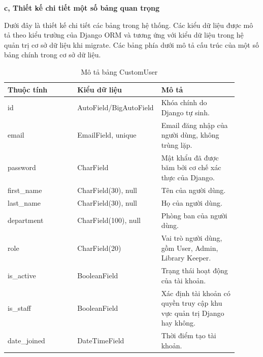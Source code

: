 ﻿\documentclass[../DoAn.tex]{subfiles}
\begin{document}
\textbf{c, Thiết kế chi tiết một số bảng quan trọng}

Dưới đây là thiết kế chi tiết các bảng trong hệ thống. Các kiểu dữ liệu được mô tả theo kiểu trường của Django ORM và tương ứng với kiểu dữ liệu trong hệ quản trị cơ sở dữ liệu khi migrate. Các bảng phía dưới mô tả cấu trúc của một số bảng chính trong cơ sở dữ liệu.

\begin{table}[H]
\centering
\caption{Mô tả bảng CustomUser}
\label{table:db-custom-user}
\small
{}
\setlength{\tabcolsep}{4pt}
\renewcommand{\arraystretch}{1.18}
\begin{tabular}{|p{0.30\linewidth}|p{0.27\linewidth}|p{0.33\linewidth}|}
\hline
\textbf{Thuộc tính} & \textbf{Kiểu dữ liệu} & \textbf{Mô tả} \\ \hline
id & AutoField/BigAutoField & Khóa chính do Django tự sinh. \\ \hline
email & EmailField, unique & Email đăng nhập của người dùng, không trùng lặp. \\ \hline
password & CharField & Mật khẩu đã được băm bởi cơ chế xác thực của Django. \\ \hline
first\_\allowbreak name & CharField(30), null & Tên của người dùng. \\ \hline
last\_\allowbreak name & CharField(30), null & Họ của người dùng. \\ \hline
department & CharField(100), null & Phòng ban của người dùng. \\ \hline
role & CharField(20) & Vai trò người dùng, gồm User, Admin, Library Keeper. \\ \hline
is\_\allowbreak active & BooleanField & Trạng thái hoạt động của tài khoản. \\ \hline
is\_\allowbreak staff & BooleanField & Xác định tài khoản có quyền truy cập khu vực quản trị Django hay không. \\ \hline
date\_\allowbreak joined & DateTimeField & Thời điểm tạo tài khoản. \\ \hline
\end{tabular}
\end{table}
\end{document}
